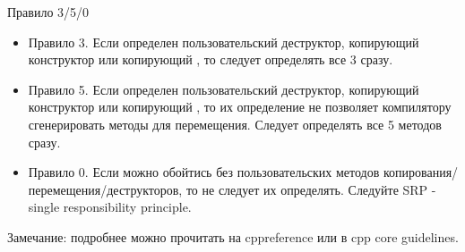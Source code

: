 \documentclass{beamer}
\begin{document}
\begin{frame}[fragile]{Правило 3/5/0}{}
    \begin{itemize}
        \item Правило 3. Если определен пользовательский деструктор, копирующий конструктор или копирующий ,
            то следует определять все 3 сразу.
        \item Правило 5. Если определен пользовательский деструктор, копирующий конструктор или копирующий ,  
            то их определение не позволяет компилятору сгенерировать методы для перемещения.
            Следует определять все 5 методов сразу.
        \item Правило 0. Если можно обойтись без пользовательских методов копирования/перемещения/деструкторов, то не следует их определять.
            Следуйте SRP - single responsibility principle.
    \end{itemize}
    Замечание: подробнее можно прочитать на cppreference или в cpp core guidelines.
\end{frame}
\end{document}
